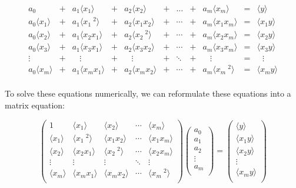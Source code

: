 \documentclass[11pt]{article}
\begin{document}
\[\begin{eqnarray*}
a_0 &+& a_1 \langle{x_1}\rangle &+& a_2 \langle{x_2}\rangle  &+& \dots &+& a_m \langle{x_m}\rangle &=& \langle{y}\rangle\\
a_0 \langle{x_{1}}\rangle &+& a_1 \langle{x_1~^2}\rangle &+& a_2 \langle{x_1 x_2}\rangle &+& \cdots &+& a_m \langle{x_1 x_m}\rangle &=&  \langle{x_1 y}\rangle\\
a_0 \langle{x_{2}}\rangle &+& a_1 \langle{x_2 x_1}\rangle &+& a_2 \langle{x_2~^2}\rangle &+& \cdots &+& a_m \langle{x_2 x_m}\rangle &=&  \langle{x_2 y}\rangle\\
a_0 \langle{x_{3}}\rangle &+& a_1 \langle{x_3 x_1}\rangle &+& a_2 \langle{x_3 x_2}\rangle &+& \cdots &+& a_m \langle{x_3 x_m}\rangle &=&  \langle{x_3 y}\rangle\\
\vdots ~~~~ &+& ~~~~\vdots &+& ~~~~\vdots &+& \ddots &+& ~~~~\vdots &=& ~~~\vdots\\
a_0 \langle{x_{m}}\rangle &+& a_1 \langle{x_m x_1}\rangle &+& a_2 \langle{x_m x_2}\rangle &+& \cdots &+& a_m \langle{x_m~^2}\rangle &=&  \langle{x_m y}\rangle\\
\end{eqnarray*}\]





    To solve these equations numerically, we can reformulate these equations
into a matrix equation:

\[
\begin{pmatrix}
1                     & \langle{x_1}\rangle      & \langle{x_2}\rangle      & \cdots & \langle{x_m}\rangle\\
\langle{x_1}\rangle   & \langle{x_1~^2}\rangle   & \langle{x_1 x_2}\rangle  & \cdots & \langle{x_1 x_m}\rangle\\
\langle{x_2}\rangle   & \langle{x_2 x_1}\rangle  & \langle{x_2~^2}\rangle   & \cdots & \langle{x_2 x_m}\rangle\\
\vdots                & \vdots                   & \vdots                   & \ddots & \vdots\\
\langle{x_m}\rangle   & \langle{x_m x_1}\rangle  & \langle{x_m x_2}\rangle  & \cdots & \langle{x_m~^2}\rangle\\
\end{pmatrix}
\begin{pmatrix}
a_0\\
a_1\\
a_2\\
\vdots\\
a_m\\
\end{pmatrix}
=
\begin{pmatrix}
\langle{y}\rangle\\
\langle{x_1 y}\rangle\\
\langle{x_2 y}\rangle\\
\vdots\\
\langle{x_m y}\rangle\\
\end{pmatrix}
\]
\end{document}
